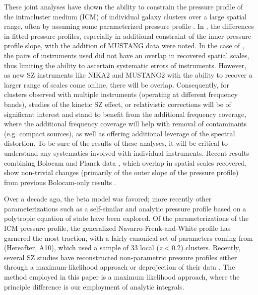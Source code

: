\documentclass[twocolumn,traditabstract]{aa}
\begin{document}
These joint analyses have shown the ability to constrain the pressure profile of the intracluster medium (ICM) of individual
galaxy clusters over a large spatial range, often by assuming some parameterized pressure profile \citep[e.g.][]{romero2017,adam2014}.
In \citet{romero2015a}, the differences in fitted pressure profiles, especially in additional constraint of the inner pressure profile
slope, with the addition of MUSTANG data were noted. In the case of
\citet{romero2017,adam2015,adam2016a}, the pairs of instruments used did not have an overlap in recovered spatial scales, thus
limiting the ability to ascertain systematic errors of instruments.
However, as new SZ instruments like NIKA2 \citep[][]{monfardini2014,calvo2016} and MUSTANG2 \citep[][]{dicker2014a}
with the ability to recover a larger range of scales come online, there will be overlap. Consequently, for clusters observed
with multiple instruments (operating at different frequency bands), studies of the kinetic SZ effect, or relativistic
corrections \citep{itoh1998} will be of significant interest and stand to benefit from the additional frequency coverage, where
the additional frequency coverage will help with removal of contaminants (e.g. compact sources), as well as offering additional
leverage of the spectral distortion. 
To be sure of the results of these analyses, it will be critical to
understand any systematics involved with individual instruments. Recent results combining Bolocam and Planck data \citep{sayers2016},
which overlap in spatial scales recovered, show non-trivial changes (primarily of the outer slope of the pressure profile)
from previous Bolocam-only results \citep{sayers2013}.

Over a decade ago, the beta model
\citep{cavaliere1978} was favored; more recently other parameterizations such as a self-similar \citep{mroczkowski2009} and
analytic pressure profile based on a polytropic equation of state \citep{bulbul2010} have been explored. Of the parameterizations
of the ICM pressure profile, the generalized Navarro-Frenk-and-White \citep[gNFW][]{nagai2007} profile has garnered the most traction,
with a fairly canonical set of parameters coming from \citet{arnaud2010} (Hereafter, A10), which used a sample of 33 local ($z < 0.2$)
clusters.
Recently, several SZ studies have reconstructed non-parametric pressure profiles either through a maximum-likelihood approach
\citep[e.g.][]{ruppin2017,sayers2013} or deprojection of their data \citep[e.g.][]{basu2010,sayers2011}. The method employed in this
paper is a maximum likelihood approach, where the principle difference is our employment of analytic integrals.
\end{document}
